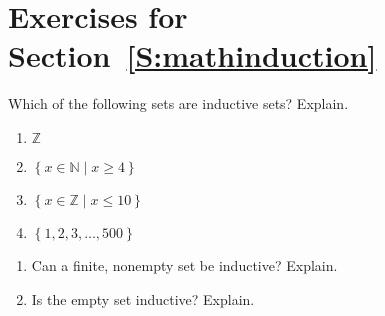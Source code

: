 \section*{Exercises for Section~\ref{S:mathinduction}}
%
\begin{enumerate}

\xitem Which of the following sets are inductive sets?  Explain. \label{exer:sec51-1}
\begin{multicols}{2}
\begin{enumerate}
  \item $\mathbb{Z}$
  \item $\left\{ {x \in \mathbb{N} \mid x \geq 4} \right\}$
  \item $\left\{ {x \in \mathbb{Z} \mid x \leq 10} \right\}$
  \item $\left\{ {1,2,3, \ldots ,500} \right\}$
\end{enumerate}
\end{multicols}

\xitem \label{exer:sec51-2} \begin{enumerate} 
  \item Can a finite, nonempty set be inductive?  Explain.
  \item Is the empty set inductive?  Explain.
\end{enumerate}

%


\end{enumerate}
